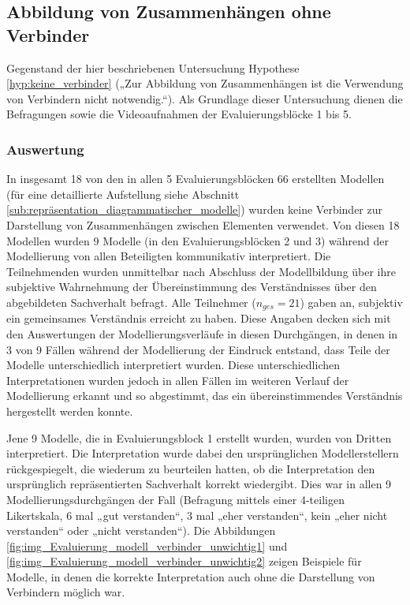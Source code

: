 
\subsection{Abbildung von Zusammenhängen ohne Verbinder} %
\label{sub:abbildung_von_zusammenhängen_ohne_verbinder}

Gegenstand der hier beschriebenen Untersuchung Hypothese \ref{hyp:keine_verbinder} („Zur Abbildung von Zusammenhängen ist die Verwendung von Verbindern nicht notwendig.“). Als Grundlage dieser Untersuchung dienen die Befragungen sowie die Videoaufnahmen der Evaluierungsblöcke 1 bis 5.

\subsubsection{Auswertung} %

In insgesamt 18 von den in allen 5 Evaluierungsblöcken 66 erstellten Modellen (für eine detaillierte Aufstellung siehe Abschnitt \ref{sub:repräsentation_diagrammatischer_modelle}) wurden keine Verbinder zur Darstellung von Zusammenhängen zwischen Elementen verwendet. Von diesen 18 Modellen wurden 9 Modelle (in den Evaluierungsblöcken 2 und 3) während der Modellierung von allen Beteiligten kommunikativ interpretiert. Die Teilnehmenden wurden unmittelbar nach Abschluss der Modellbildung über ihre subjektive Wahrnehmung der Übereinstimmung des Verständnisses über den abgebildeten Sachverhalt befragt. Alle Teilnehmer ($n_{ges}=21$) gaben an, subjektiv ein gemeinsames Verständnis erreicht zu haben. Diese Angaben decken sich mit den Auswertungen der Modellierungsverläufe in diesen Durchgängen, in denen in 3 von 9 Fällen während der Modellierung der Eindruck entstand, dass Teile der Modelle unterschiedlich interpretiert wurden. Diese unterschiedlichen Interpretationen wurden jedoch in allen Fällen im weiteren Verlauf der Modellierung erkannt und so abgestimmt, das ein übereinstimmendes Verständnis hergestellt werden konnte.

Jene 9 Modelle, die in Evaluierungsblock 1 erstellt wurden, wurden von Dritten interpretiert. Die Interpretation wurde dabei den ursprünglichen Modellerstellern rückgespiegelt, die wiederum zu beurteilen hatten, ob die Interpretation den ursprünglich repräsentierten Sachverhalt korrekt wiedergibt. Dies war in allen 9 Modellierungsdurchgängen der Fall (Befragung mittels einer 4-teiligen Likertskala, 6 mal „gut verstanden“, 3 mal „eher verstanden“, kein „eher nicht verstanden“ oder „nicht verstanden“). Die Abbildungen  \ref{fig:img_Evaluierung_modell_verbinder_unwichtig1} und \ref{fig:img_Evaluierung_modell_verbinder_unwichtig2} zeigen Beispiele für Modelle, in denen die korrekte Interpretation auch ohne die Darstellung von Verbindern möglich war.

